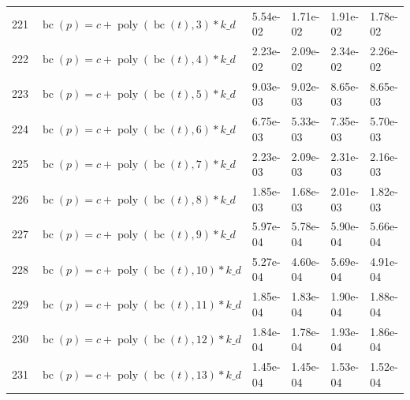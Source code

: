 \documentclass[12pt,a4paper]{article}
\DeclareMathOperator{\bc}{bc}
\DeclareMathOperator{\poly}{poly}
\begin{document}
\begin{longtable}[t]{ll>{\raggedleft\arraybackslash}p{2cm}>{\raggedleft\arraybackslash}p{2cm}>{\raggedleft\arraybackslash}p{2cm}>{\raggedleft\arraybackslash}p{2cm}}
\rowcolor{gray!6}  221 & $\bc(p) = c + \poly\left( \bc(t), 3 \right) * k\_d$ & 5.54e-02 & 1.71e-02 & 1.91e-02 & 1.78e-02\\
222 & $\bc(p) = c + \poly\left( \bc(t), 4 \right) * k\_d$ & 2.23e-02 & 2.09e-02 & 2.34e-02 & 2.26e-02\\
\rowcolor{gray!6}  223 & $\bc(p) = c + \poly\left( \bc(t), 5 \right) * k\_d$ & 9.03e-03 & 9.02e-03 & 8.65e-03 & 8.65e-03\\
224 & $\bc(p) = c + \poly\left( \bc(t), 6 \right) * k\_d$ & 6.75e-03 & 5.33e-03 & 7.35e-03 & 5.70e-03\\
\rowcolor{gray!6}  225 & $\bc(p) = c + \poly\left( \bc(t), 7 \right) * k\_d$ & 2.23e-03 & 2.09e-03 & 2.31e-03 & 2.16e-03\\
226 & $\bc(p) = c + \poly\left( \bc(t), 8 \right) * k\_d$ & 1.85e-03 & 1.68e-03 & 2.01e-03 & 1.82e-03\\
\rowcolor{gray!6}  227 & $\bc(p) = c + \poly\left( \bc(t), 9 \right) * k\_d$ & 5.97e-04 & 5.78e-04 & 5.90e-04 & 5.66e-04\\
228 & $\bc(p) = c + \poly\left( \bc(t), 10 \right) * k\_d$ & 5.27e-04 & 4.60e-04 & 5.69e-04 & 4.91e-04\\
\rowcolor{gray!6}  229 & $\bc(p) = c + \poly\left( \bc(t), 11 \right) * k\_d$ & 1.85e-04 & 1.83e-04 & 1.90e-04 & 1.88e-04\\
230 & $\bc(p) = c + \poly\left( \bc(t), 12 \right) * k\_d$ & 1.84e-04 & 1.78e-04 & 1.93e-04 & 1.86e-04\\
\rowcolor{gray!6}  231 & $\bc(p) = c + \poly\left( \bc(t), 13 \right) * k\_d$ & 1.45e-04 & 1.45e-04 & 1.53e-04 & 1.52e-04\\*
\end{longtable}
\endgroup{}

\FloatBarrier
\end{document}
